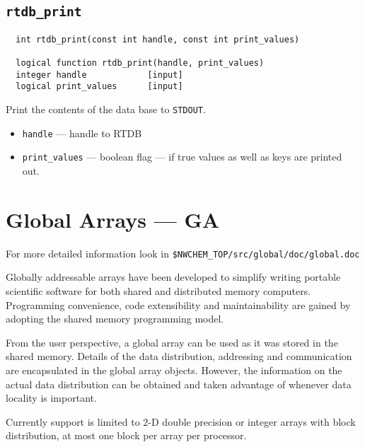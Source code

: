 \subsection{{\tt rtdb\_print}}
\begin{verbatim}
  int rtdb_print(const int handle, const int print_values)

  logical function rtdb_print(handle, print_values)
  integer handle            [input]
  logical print_values      [input]
\end{verbatim}
Print the contents of the data base to {\tt STDOUT}.
\begin{itemize}
\item {\tt handle} --- handle to RTDB
\item {\tt print\_values} --- boolean flag --- if true values as
  well as keys are printed out.
\end{itemize}


\section{Global Arrays --- GA}

\sloppy
For more detailed information look in 
{\tt \$NWCHEM\_TOP/src/global/doc/global.doc}     %

\fussy

Globally addressable arrays have been developed to simplify writing
portable scientific software for both shared and distributed memory
computers.  Programming convenience, code extensibility and
maintainability are gained by adopting the shared memory programming
model.

From the user perspective, a global array can be used as it was stored
in the shared memory. Details of the data distribution, addressing and
communication are encapsulated in the global array objects. However,
the information on the actual data distribution can be obtained and
taken advantage of whenever data locality is important.

Currently support is limited to 2-D double precision or integer arrays
with block distribution, at most one block per array per processor.

